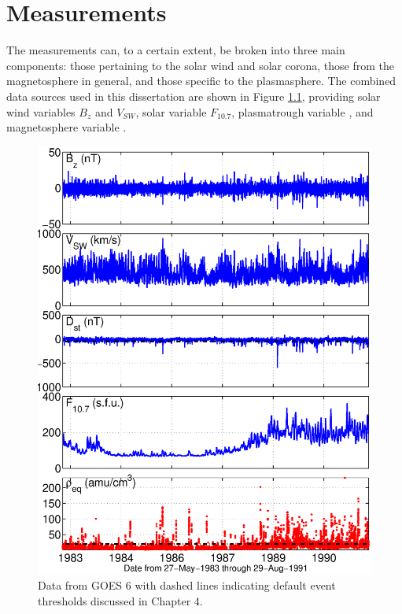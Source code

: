 \chapter[Measurements]{Measurements}


The measurements can, to a certain extent, be broken into three main components: those pertaining to the solar wind and solar corona, those from the magnetosphere in general, and those specific to the plasmasphere. The combined data sources used in this dissertation are shown in Figure \ref{fig:alldata-GOES6-1983-1991}, providing solar wind variables $B_z$ and $V_{SW}$, solar variable $F_{10.7}$, plasmatrough variable \req, and magnetosphere variable \dst.

\begin{figure}[htp!]
	\centering
	\includegraphics[width=1\linewidth]{Figures/alldata-GOES6-1983-1991}
	\caption{Data from GOES 6 with dashed lines indicating default event thresholds discussed in Chapter 4.}
	\label{fig:alldata-GOES6-1983-1991}
\end{figure}

